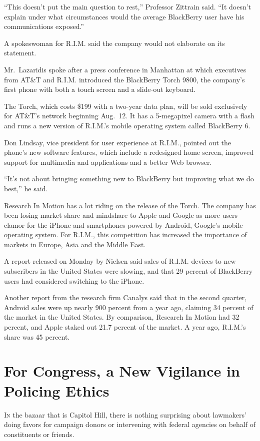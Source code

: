 ﻿\documentclass[12pt]{article}
\begin{document}
``This doesn't put the main question to rest,'' Professor Zittrain said. ``It doesn't explain under
what circumstances would the average BlackBerry user have his communications exposed.''

A spokeswoman for R.I.M. said the company would not elaborate on its statement.

Mr.~Lazaridis spoke after a press conference in Manhattan at which executives from AT\&T and R.I.M.
introduced the BlackBerry Torch 9800, the company's first phone with both a touch screen and a
slide-out keyboard.

The Torch, which costs \$199 with a two-year data plan, will be sold exclusively for AT\&T's network
beginning Aug.~12. It has a 5-megapixel camera with a flash and runs a new version of R.I.M.'s
mobile operating system called BlackBerry 6.

Don Lindsay, vice president for user experience at R.I.M., pointed out the phone's new software
features, which include a redesigned home screen, improved support for multimedia and applications
and a better Web browser.

``It's not about bringing something new to BlackBerry but improving what we do best,'' he said.

Research In Motion has a lot riding on the release of the Torch. The company has been losing market
share and mindshare to Apple and Google as more users clamor for the iPhone and smartphones powered
by Android, Google's mobile operating system. For R.I.M., this competition has increased the
importance of markets in Europe, Asia and the Middle East.

A report released on Monday by Nielsen said sales of R.I.M. devices to new subscribers in the United
States were slowing, and that 29 percent of BlackBerry users had considered switching to the iPhone.

Another report from the research firm Canalys said that in the second quarter, Android sales were up
nearly 900 percent from a year ago, claiming 34 percent of the market in the United States. By
comparison, Research In Motion had 32 percent, and Apple staked out 21.7 percent of the market. A
year ago, R.I.M.'s share was 45 percent.

\section{For Congress, a New Vigilance in Policing Ethics}

\lettrine{I}{n} the bazaar that is Capitol Hill, there is nothing surprising
about lawmakers' doing favors for campaign donors or intervening with federal agencies on behalf of
constituents or friends.
\end{document}
